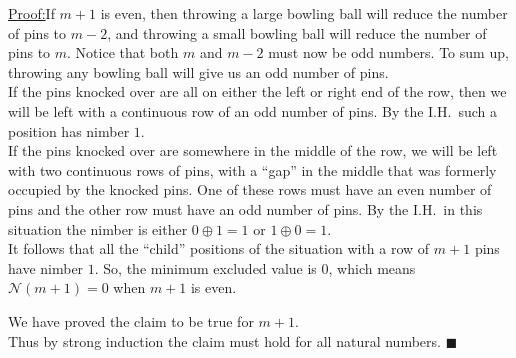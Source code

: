 \documentclass{article}
\newcommand{\nim}{\mathcal{N}}
\newcommand{\xor}{\oplus}
\newenvironment{claimproof}[1]{\par\noindent\underline{Proof:}\space#1}
{\hfill $\blacksquare$}
\begin{document}
\begin{claimproof}
  If $m + 1$ is even, then throwing a large bowling ball will
  reduce the number of pins to $m - 2$, and throwing a small
  bowling ball will reduce the number of pins to $m$. Notice
  that both $m$ and $m - 2$ must now be odd numbers. To sum up,
  throwing any bowling ball will give us an odd number of
  pins. \\
  If the pins knocked over are all on either the left or right
  end of the row, then we will be left with a continuous row
  of an odd number of pins. By the I.H.\ such a position has
  nimber $1$. \\
  If the pins knocked over are somewhere in the middle of the row,
  we will be left with two continuous rows of pins, with a
  ``gap'' in the middle that was formerly occupied by the
  knocked pins. One of these rows must have an even number of pins
  and the other row must have an odd number of pins. By the
  I.H.\ in this situation the nimber is either $0 \xor 1 = 1$
  or $1 \xor 0 = 1$. \\
  It follows that all the ``child'' positions of the situation with
  a row of $m + 1$ pins have nimber $1$. So, the minimum excluded
  value is $0$, which means $\nim(m + 1) = 0$ when $m + 1$ is even. 
  \smallskip

  We have proved the claim to be true for $m + 1$. \\
  Thus by strong induction the claim must hold for all natural
  numbers.
\end{claimproof}
\newpage
\end{document}
